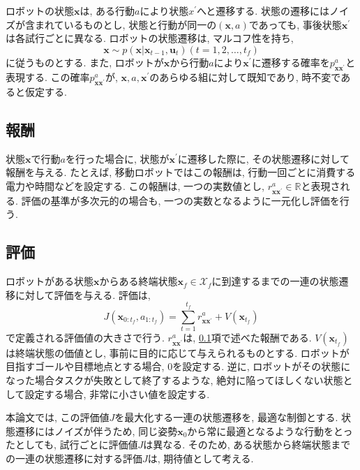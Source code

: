 ロボットの状態$\bm{x}$は, ある行動$a$により状態$x^{'}$へと遷移する. 
状態の遷移にはノイズが含まれているものとし, 状態と行動が同一の$(\bm{x}, a)$であっても, 事後状態$\bm{x}^{'}$は各試行ごとに異なる. 
ロボットの状態遷移は, マルコフ性を持ち, 
\begin{equation}
\label{trans prob}
  \bm{x} \sim p(\bm{x} | \bm{x}_{t-1}, \bm{u}_t) (t=1,2,\ldots,t_{f})
\end{equation}
に従うものとする. 
また, ロボットが$\bm{x}$から行動$a$により$\bm{x}^{'}$に遷移する確率を$p^{a}_{\bm{x}\bm{x}^{'}}$と表現する. 
この確率$p^{a}_{\bm{x}\bm{x}^{'}}$が, $\bm{x}, a, \bm{x}^{'}$のあらゆる組に対して既知であり, 時不変であると仮定する. 

\subsection{報酬} \label{subsection:reward}
状態$\bm{x}$で行動$a$を行った場合に, 状態が$\bm{x}^{'}$に遷移した際に, その状態遷移に対して報酬を与える. 
たとえば, 移動ロボットではこの報酬は, 行動一回ごとに消費する電力や時間などを設定する. 
この報酬は, 一つの実数値とし, $r^{a}_{\bm{x}\bm{x}^{'}} \in \mathbb{R}$と表現される. 
評価の基準が多次元的の場合も, 一つの実数となるように一元化し評価を行う. 

\subsection{評価}
ロボットがある状態$\bm{x}$からある終端状態$\bm{x}_{f} \in \mathcal{X}_{f}$に到達するまでの一連の状態遷移に対して評価を与える. 
評価は, 
\begin{equation}
\label{evaluation}
  J( \bm{x}_{0:t_{f}}, a_{1:t_{f}} ) = \sum^{t_{f}}_{t=1} r^{a}_{\bm{x}\bm{x}^{'}} + V(\bm{x}_{t_{f}})
\end{equation}
で定義される評価値の大きさで行う. 
$r^{a}_{\bm{x}\bm{x}^{'}}$は, \ref{subsection:reward}項で述べた報酬である. 
$V(\bm{x}_{t_{f}})$は終端状態の価値とし, 事前に目的に応じて与えられるものとする. 
ロボットが目指すゴールや目標地点とする場合, $0$を設定する. 
逆に, ロボットがその状態になった場合タスクが失敗として終了するような, 絶対に陥ってほしくない状態として設定する場合, 非常に小さい値を設定する. 

本論文では, この評価値$J$を最大化する一連の状態遷移を, 最適な制御とする. 
状態遷移にはノイズが伴うため, 同じ姿勢$\bm{x}_{0}$から常に最適となるような行動をとったとしても, 試行ごとに評価値$J$は異なる. 
そのため, ある状態から終端状態までの一連の状態遷移に対する評価$J$は, 期待値として考える. 

